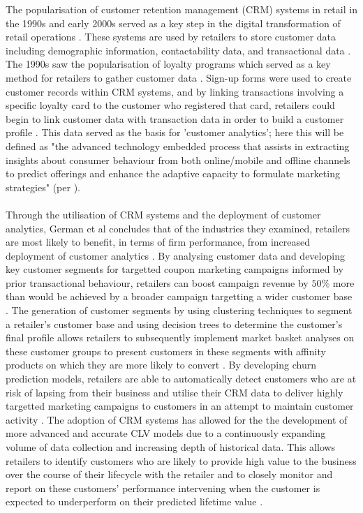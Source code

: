 \documentclass[11pt]{article}
\theoremstyle{plain}
\theoremstyle{definition}
\begin{document}
The popularisation of customer retention management (CRM) systems in retail in the 1990s and early 2000s served as a key step in the digital transformation of retail operations \cite{:2000aa} \cite{Feinberg:2002aa}. These systems are used by retailers to store customer data including demographic information, contactability data, and transactional data \cite{PELTIER20131}. The 1990s saw the popularisation of loyalty programs which served as a key method for retailers to gather customer data \cite{Rowley:2000aa}. Sign-up forms were used to create customer records within CRM systems, and by linking transactions involving a specific loyalty card to the customer who registered that card, retailers could begin to link customer data with transaction data in order to build a customer profile \cite{Rowley:2000aa}. This data served as the basis for 'customer analytics'; here this will be defined as "the advanced technology embedded process that assists in extracting insights about consumer behaviour from both online/mobile and offline channels to predict offerings and enhance the adaptive capacity to formulate marketing strategies" (per \cite{HOSSAIN2020102187}).\\
\\
Through the utilisation of CRM systems and the deployment of customer analytics, German et al concludes that of the industries they examined, retailers are most likely to benefit, in terms of firm performance, from increased deployment of customer analytics \cite{GERMANN2014587}. By analysing customer data and developing key customer segments for targetted coupon marketing campaigns informed by prior transactional behaviour, retailers can boost campaign revenue by $50\%$ more than would be achieved by a broader campaign targetting a wider customer base \cite{Rossi:1996aa}. The generation of customer segments by using clustering techniques to segment a retailer's customer base and using decision trees to determine the customer's final profile allows retailers to subsequently implement market basket analyses on these customer groups to present customers in these segments with affinity products on which they are more likely to convert \cite{segment-cluster}. By developing churn prediction models, retailers are able to automatically detect customers who are at risk of lapsing from their business and utilise their CRM data to deliver highly targetted marketing campaigns to customers in an attempt to maintain customer activity \cite{MIGUEIS201211250}. The adoption of CRM systems has allowed for the the development of more advanced and accurate CLV models due to a continuously expanding volume of data collection and increasing depth of historical data. This allows retailers to identify customers who are likely to provide high value to the business over the course of their lifecycle with the retailer and to closely monitor and report on these customers' performance intervening when the customer is expected to underperform on their predicted lifetime value \cite{GLADY20092062}. \\
\end{document}
